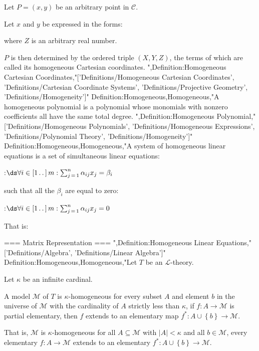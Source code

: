 Let $P = \left( x, y \right)$ be an arbitrary point in $\mathcal C$.


Let $x$ and $y$ be expressed in the forms:






where $Z$ is an arbitrary real number.


$P$ is then determined by the ordered triple $\left( X, Y, Z \right)$, the terms of which are called its homogeneous Cartesian coordinates.
",Definition:Homogeneous Cartesian Coordinates,"['Definitions/Homogeneous Cartesian Coordinates', 'Definitions/Cartesian Coordinate Systems', 'Definitions/Projective Geometry', 'Definitions/Homogeneity']"
Definition:Homogeneous,Homogeneous,"A homogeneous polynomial is a polynomial whose monomials with nonzero coefficients all have the same total degree.
",Definition:Homogeneous Polynomial,"['Definitions/Homogeneous Polynomials', 'Definitions/Homogeneous Expressions', 'Definitions/Polynomial Theory', 'Definitions/Homogeneity']"
Definition:Homogeneous,Homogeneous,"A system of homogeneous linear equations is a set of simultaneous linear equations:

:$\ds \forall i \in \left[ 1 \,.\,.\,   \right]m: \sum_{j \mathop = 1}^n \alpha_{i j} x_j = \beta_i$

such that all the $\beta_i$ are equal to zero:

:$\ds \forall i \in \left[ 1 \,.\,.\,   \right]m : \sum_{j \mathop = 1}^n \alpha_{i j} x_j = 0$

That is:









=== Matrix Representation ===
",Definition:Homogeneous Linear Equations,"['Definitions/Algebra', 'Definitions/Linear Algebra']"
Definition:Homogeneous,Homogeneous,"Let $T$ be an $\mathcal L$-theory.

Let $\kappa$ be an infinite cardinal.


A model $\mathcal M$ of $T$ is $\kappa$-homogeneous  for every subset $A$ and element $b$ in the universe of $\mathcal M$ with the cardinality of $A$ strictly less than $\kappa$, if $f: A \to \mathcal M$ is partial elementary, then $f$ extends to an elementary map $f^*: A \cup \left\lbrace b \right\rbrace \to \mathcal M$.

That is, $\mathcal M$ is $\kappa$-homogeneous  for all $A \subseteq \mathcal M$ with  $\left\lvert A \right\rvert < \kappa$ and all $b \in \mathcal M$, every elementary $f: A \to \mathcal M$ extends to an elementary $f^*: A \cup \left\lbrace b \right\rbrace \to \mathcal M$.


